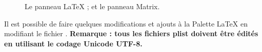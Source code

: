 \documentclass[11pt,french]{article}
\newcommand{\cmd}[1]{\textsf{#1}}
\newcommand{\mnu}[1]{\textsf{#1}}
\begin{document}
\begin{figure}
{}%
\qquad%
%
\caption[Les panneaux LaTeX et Matrix.]{
 Le panneau LaTeX ; et
 le panneau Matrix.}
\label{LandMPanels}
\end{figure}

Il est possible de faire quelques modifications et ajouts à la \mnu{Palette LaTeX} en modifiant le fichier . \textbf{Remarque : tous les fichiers \cmd{plist} doivent être édités en utilisant le codage Unicode UTF-8.}

\end{document}
